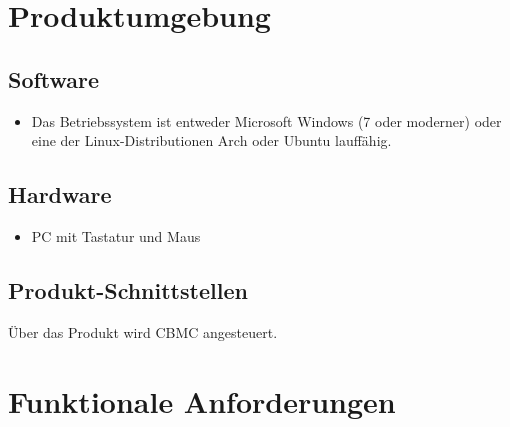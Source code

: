 \documentclass[a4paper]{scrreprt}
\begin{document}
\chapter{Produktumgebung}

\section{Software}
\begin{itemize}
\item Das Betriebssystem ist entweder Microsoft Windows (7 oder moderner) oder eine der Linux-Distributionen Arch oder Ubuntu lauffähig.
\end{itemize}

\section{Hardware}
\begin{itemize}
\item PC mit Tastatur und Maus
\end{itemize}

\section{Produkt-Schnittstellen}
Über das Produkt wird \ac{CBMC} angesteuert.

\chapter{Funktionale Anforderungen}
\end{document}
